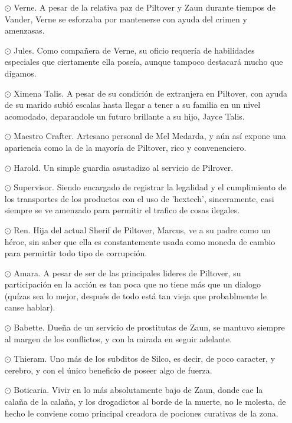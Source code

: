 \documentclass[11pt,a5paper]{article}
\begin{document}
\begin{itemize}
    \item[$\odot$] Verne. A pesar de la relativa paz de Piltover y Zaun durante tiempos de Vander, Verne se esforzaba por mantenerse con ayuda del crimen y amenzasas.
    \item[$\odot$] Jules. Como compañera de Verne, su oficio requería de habilidades especiales que ciertamente ella poseía, aunque tampoco destacará mucho que digamos.
    \item[$\odot$] Ximena Talis. A pesar de su condición de extranjera en Piltover, con ayuda de su marido subió escalas hasta llegar a tener a su familia en un nivel acomodado, deparandole un futuro brillante a su hijo, Jayce Talis.
    \item[$\odot$] Maestro Crafter. Artesano personal de Mel Medarda, y aún así expone una apariencia como la de la mayoría de Piltover, rico y convenenciero.
    \item[$\odot$] Harold. Un simple guardia asustadizo al servicio de Pilrover.
    \item[$\odot$] Supervisor. Siendo encargado de registrar la legalidad y el cumplimiento de los transportes de los productos con el uso de 'hextech', sinceramente, casi siempre se ve amenzado para permitir el trafico de cosas ilegales.	
    \item[$\odot$] Ren. Hija del actual Sherif de Piltover, Marcus, ve a su padre como un héroe, sin saber que ella es constantemente usada como moneda de cambio para permirtir todo tipo de corrupción.
    \item[$\odot$] Amara. A pesar de ser de las principales lideres de Piltover, su participación en la acción es tan poca que no tiene más que un dialogo (quízas sea lo mejor, después de todo está tan vieja que probablmente le canse hablar).
    \item[$\odot$] Babette. Dueña de un servicio de prostitutas de Zaun, se mantuvo siempre al margen de los conflictos, y con la mirada en seguir adelante.
    \item[$\odot$] Thieram. Uno más de los subditos de Silco, es decir, de poco caracter, y cerebro, y con el único beneficio de poseer algo de fuerza.
    \item[$\odot$] Boticaria. Vivir en lo más absolutamente bajo de Zaun, donde cae la calaña de la calaña, y los drogadictos al borde de la muerte, no le molesta, de hecho le conviene como principal creadora de pociones curativas de la zona.
\end{itemize}
\end{document}
